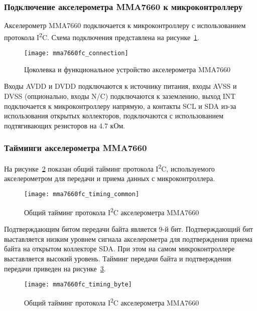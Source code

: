 \documentclass[document.tex]{subfiles}
\begin{document}
\clearpage
\subsubsection{Подключение акселерометра MMA7660 к микроконтроллеру}
Акселерометр MMA7660 подключается к микроконтроллеру с использованием протокола I\textsuperscript{2}C. Схема подключения представлена на рисунке~\ref{fig:mma7660fc_connection}.

\begin{figure}[here]
\centering
\texttt{[image: mma7660fc\_connection]}
\caption{Цоколевка и функциональное устройство акселерометра MMA7660}
\label{fig:mma7660fc_connection}
\end{figure}

Входы AVDD и DVDD подключаются к источнику питания, входы AVSS и DVSS (опцио\-нально, входы N/C) подключаются к заземлению, выход INT подключается к микрокон\-троллеру
напрямую, а контакты SCL и SDA из-за использования открытых коллекторов, подключаются с использованием подтягивающих резисторов на 4.7 кОм.\cite{accelerometer_mma7660, basics}

\clearpage
\subsubsection{Тайминги акселерометра MMA7660}
На рисунке~\ref{fig:mma7660fc_timing_common} показан общий тайминг протокола I\textsuperscript{2}C, используемого акселерометром для передачи и приема данных с микроконтроллера.
\begin{figure}[here]
\centering
\texttt{[image: mma7660fc\_timing\_common]}
\caption{Общий тайминг протокола I\textsuperscript{2}C акселерометра MMA7660}
\label{fig:mma7660fc_timing_common}
\end{figure}

Подтверждающим битом передачи байта является 9-й бит. Подтверждающий бит выстав\-ляется низким уровнем сигнала акселерометра для подтверждения приема байта на открытом коллекторе
SDA. При этом на самом микроконтроллере выставляется высокий уровень. Тайминг передачи байта и подтверждения передачи приведен на
рисунке~\ref{fig:mma7660fc_timing_byte}.\cite{accelerometer_mma7660}

\begin{figure}[here]
\centering
\texttt{[image: mma7660fc\_timing\_byte]}
\caption{Общий тайминг протокола I\textsuperscript{2}C акселерометра MMA7660}
\label{fig:mma7660fc_timing_byte}
\end{figure}
\end{document}
